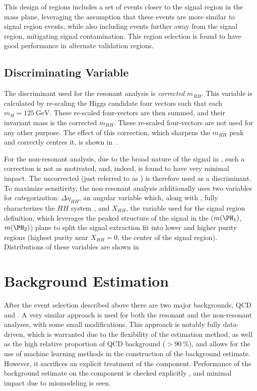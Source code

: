 This design of regions includes a set of events closer to the signal region in the mass plane, leveraging
the assumption that these events are more similar to signal region events, while also including events further away
from the signal region, mitigating signal contamination. This region selection is found to have good performance
in alternate validation regions. 

\subsection{Discriminating Variable}
\label{subsec:disc-var}

The discriminant used for the resonant analysis is \emph{corrected $m_{HH}$}. This
variable is calculated by re-scaling the Higgs candidate four vectors such that
each $m_{H} = \SI{125}{\GeV}$. These re-scaled four-vectors are then summed, and
their invariant mass is the corrected $m_{HH}$. These re-scaled four-vectors are
not used for any other purpose. The effect of this correction, which sharpens
the $m_{HH}$ peak and correctly centres it, is shown
in~\Fig{\ref{fig:m-hh-cor-effect}}.

For the non-resonant analysis, due to the broad nature of the signal in \mhh, such a 
correction is not as motivated, and, indeed, is found to have very minimal 
impact. The uncorrected \mhh (just referred to as \mhh) is therefore used 
as a discriminant. To maximize sensitivity, the non-resonant analysis 
additionally uses two variables for categorization: $\Delta \eta_{HH}$, an angular 
variable which, along with \mhh, fully characterizes the $HH$ system
, and $X_{HH}$, the variable used for the 
signal region definition, which leverages the peaked structure of the 
signal in the ($\mh1$, $\mh2$) plane to split the signal extraction fit into lower and higher
purity regions (highest purity near $X_{HH} = 0$, the center of the signal region).
Distributions of these variables are shown in 


\FloatBarrier
\clearpage
\section{Background Estimation}
\label{sec:bkgdestimation}
After the event selection described above there are
two major backgrounds, QCD and \ttbar. A very similar approach is used 
for both the resonant and the non-resonant analyses, with some small modifications. 
This approach is notably fully data-driven, which is warranted due to 
the flexibility of the estimation method, as well as the high relative proportion of 
QCD background ($>90~\%$), and allows for the use of machine learning methods in the construction of
the background estimate. However, it sacrifices an explicit treatment of the
\ttbar component. Performance of the background estimate on the \ttbar component
is checked explicitly , and minimal impact due to \ttbar 
mismodeling is seen.

